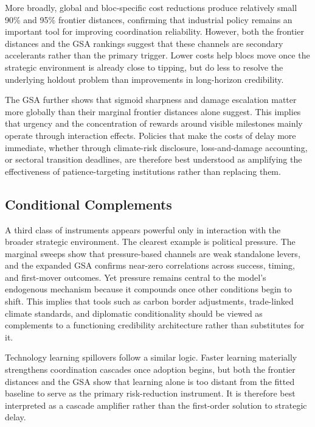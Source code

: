 \documentclass[12pt,a4paper]{article}
\begin{document}
More broadly, global and bloc-specific cost reductions produce relatively small 90\% and 95\% frontier distances, confirming that industrial policy remains an important tool for improving coordination reliability. However, both the frontier distances and the GSA rankings suggest that these channels are secondary accelerants rather than the primary trigger. Lower costs help blocs move once the strategic environment is already close to tipping, but do less to resolve the underlying holdout problem than improvements in long-horizon credibility.

The GSA further shows that sigmoid sharpness and damage escalation matter more globally than their marginal frontier distances alone suggest. This implies that urgency and the concentration of rewards around visible milestones mainly operate through interaction effects. Policies that make the costs of delay more immediate, whether through climate-risk disclosure, loss-and-damage accounting, or sectoral transition deadlines, are therefore best understood as amplifying the effectiveness of patience-targeting institutions rather than replacing them.

\subsection{Conditional Complements}

A third class of instruments appears powerful only in interaction with the broader strategic environment. The clearest example is political pressure. The marginal sweeps show that pressure-based channels are weak standalone levers, and the expanded GSA confirms near-zero correlations across success, timing, and first-mover outcomes. Yet pressure remains central to the model's endogenous mechanism because it compounds once other conditions begin to shift. This implies that tools such as carbon border adjustments, trade-linked climate standards, and diplomatic conditionality should be viewed as complements to a functioning credibility architecture rather than substitutes for it.

Technology learning spillovers follow a similar logic. Faster learning materially strengthens coordination cascades once adoption begins, but both the frontier distances and the GSA show that learning alone is too distant from the fitted baseline to serve as the primary risk-reduction instrument. It is therefore best interpreted as a cascade amplifier rather than the first-order solution to strategic delay.
\end{document}
